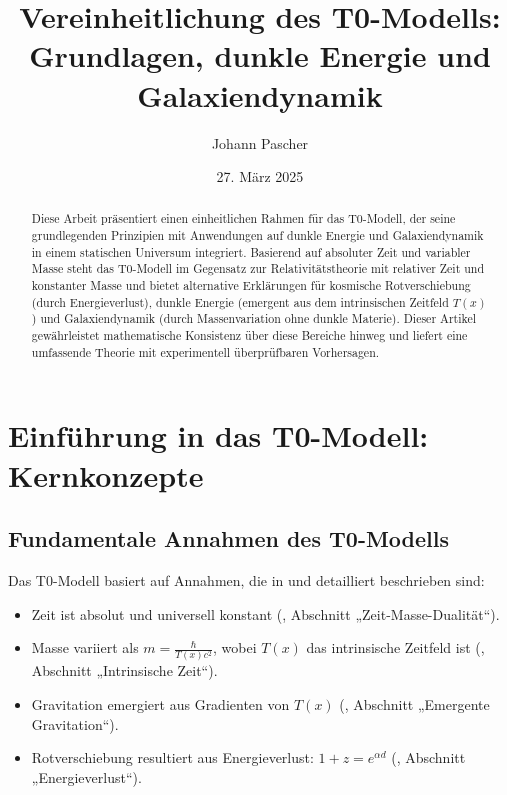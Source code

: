 \documentclass[a4paper,12pt]{article}
\theoremstyle{definition}
\theoremstyle{remark}
\newcommand{\Tfield}{T(x)}
\begin{document}
	
	\title{Vereinheitlichung des T0-Modells: \\Grundlagen, dunkle Energie und Galaxiendynamik}
	\author{Johann Pascher}
	\date{27. März 2025}
	\maketitle
	
	\begin{abstract}
		Diese Arbeit präsentiert einen einheitlichen Rahmen für das T0-Modell, der seine grundlegenden Prinzipien mit Anwendungen auf dunkle Energie und Galaxiendynamik in einem statischen Universum integriert. Basierend auf absoluter Zeit und variabler Masse steht das T0-Modell im Gegensatz zur Relativitätstheorie mit relativer Zeit und konstanter Masse und bietet alternative Erklärungen für kosmische Rotverschiebung (durch Energieverlust), dunkle Energie (emergent aus dem intrinsischen Zeitfeld \(\Tfield\)) und Galaxiendynamik (durch Massenvariation ohne dunkle Materie). Dieser Artikel gewährleistet mathematische Konsistenz über diese Bereiche hinweg und liefert eine umfassende Theorie mit experimentell überprüfbaren Vorhersagen.
	\end{abstract}
	
	\tableofcontents
	\newpage
	
	\section{Einführung in das T0-Modell: Kernkonzepte}
	
	\subsection{Fundamentale Annahmen des T0-Modells}
	
	Das T0-Modell basiert auf Annahmen, die in \cite{pascher_params_2025} und \cite{pascher_galaxies_2025} detailliert beschrieben sind:
	
	\begin{tcolorbox}[colback=blue!5!white,colframe=blue!75!black,title=Fundamentale Annahmen des T0-Modells]
		\begin{itemize}
			\item Zeit ist absolut und universell konstant (\cite{pascher_params_2025}, Abschnitt „Zeit-Masse-Dualität“).
			\item Masse variiert als \(m = \frac{\hbar}{\Tfield c^2}\), wobei \(\Tfield\) das intrinsische Zeitfeld ist (\cite{pascher_params_2025}, Abschnitt „Intrinsische Zeit“).
			\item Gravitation emergiert aus Gradienten von \(\Tfield\) (\cite{pascher_galaxies_2025}, Abschnitt „Emergente Gravitation“).
			\item Rotverschiebung resultiert aus Energieverlust: \(1 + z = e^{\alpha d}\) (\cite{pascher_messdifferenzen_2025}, Abschnitt „Energieverlust“).
		\end{itemize}
	\end{tcolorbox}
	
\end{document}
